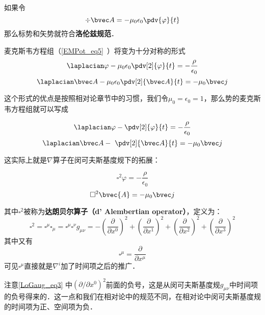 
\begin{issues}
\issueDraft
\end{issues}

如果令
\begin{equation}
\div \bvec A = -\mu_0 \epsilon_0 \pdv{\varphi}{t}
\end{equation}
那么标势和矢势就符合\textbf{洛伦兹规范}． 

麦克斯韦方程组（\autoref{EMPot_eq5}~）将变为十分对称的形式
\begin{equation}\label{LoGaug_eq1}
\laplacian \varphi - \mu_0\epsilon_0 \pdv[2]{\varphi}{t} = -\frac{\rho}{\epsilon_0}
\end{equation}
\begin{equation}\label{LoGaug_eq2}
\laplacian \bvec A - \mu_0\epsilon_0 \pdv[2]{\bvec A}{t} = -\mu_0 \bvec j
\end{equation}

这个形式的优点是按照相对论章节中的习惯，我们令$\mu_0=\epsilon_0=1$，那么势的麦克斯韦方程组就可以写成

\begin{equation}
\laplacian \varphi -  \pdv[2]{\varphi}{t} = -\frac{\rho}{\epsilon_0}
\end{equation}
\begin{equation}
\laplacian \bvec A - \ \pdv[2]{\bvec A}{t} = -\mu_0 \bvec j
\end{equation}

这实际上就是$\nabla$算子在闵可夫斯基度规下的拓展：

\begin{equation}
\square^2 \varphi = -\frac{\rho}{\epsilon_0}
\end{equation}
\begin{equation}
\square^2 \bvec{A} = -\mu_0 \bvec j
\end{equation}

其中$\square^2$被称为\textbf{达朗贝尔算子（d' Alembertian operator）}，定义为：
\begin{equation}\label{LoGaug_eq3}
\square^2=\square^\mu\square_\mu=\square^\mu\square^\nu g_{\mu\nu}=-(\frac{\partial}{\partial x^0})^2+(\frac{\partial}{\partial x^1})^2+(\frac{\partial}{\partial x^2})^2+(\frac{\partial}{\partial x^3})^2
\end{equation}
其中又有
\begin{equation}
\square^\mu=\frac{\partial}{\partial x^\mu}
\end{equation}
可见$\square^\mu$直接就是$\nabla^i$加了时间项之后的推广．

注意\autoref{LoGaug_eq3} 中$(\partial/\partial x^0)^2$前面的负号，这是从闵可夫斯基度规$g_{\mu\nu}$中时间项的负号得来的．这一点和我们在相对论中的规范不同，在相对论中闵可夫斯基度规的时间项为正、空间项为负．





